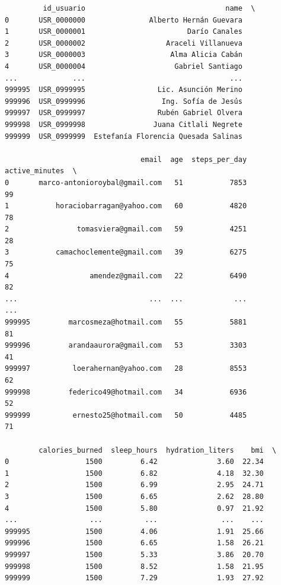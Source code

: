 \begin{lstlisting}
         id_usuario                                 name  \
0       USR_0000000               Alberto Hernán Guevara   
1       USR_0000001                        Darío Canales   
2       USR_0000002                   Araceli Villanueva   
3       USR_0000003                    Alma Alicia Cabán   
4       USR_0000004                     Gabriel Santiago   
...             ...                                  ...   
999995  USR_0999995                 Lic. Asunción Merino   
999996  USR_0999996                  Ing. Sofía de Jesús   
999997  USR_0999997                 Rubén Gabriel Olvera   
999998  USR_0999998                Juana Citlali Negrete   
999999  USR_0999999  Estefanía Florencia Quesada Salinas   

                                email  age  steps_per_day  active_minutes  \
0       marco-antonioroybal@gmail.com   51           7853              99   
1           horaciobarragan@yahoo.com   60           4820              78   
2                tomasviera@gmail.com   59           4251              28   
3           camachoclemente@gmail.com   39           6275              75   
4                   amendez@gmail.com   22           6490              82   
...                               ...  ...            ...             ...   
999995         marcosmeza@hotmail.com   55           5881              81   
999996         arandaaurora@gmail.com   53           3303              41   
999997          loerahernan@yahoo.com   28           8553              62   
999998         federico49@hotmail.com   34           6936              52   
999999          ernesto25@hotmail.com   50           4485              71   

        calories_burned  sleep_hours  hydration_liters    bmi  \
0                  1500         6.42              3.60  22.34   
1                  1500         6.82              4.18  32.30   
2                  1500         6.99              2.95  24.71   
3                  1500         6.65              2.62  28.80   
4                  1500         5.80              0.97  21.92   
...                 ...          ...               ...    ...   
999995             1500         4.06              1.91  25.66   
999996             1500         6.65              1.58  26.21   
999997             1500         5.33              3.86  20.70   
999998             1500         8.52              1.58  21.95   
999999             1500         7.29              1.93  27.92   


\end{lstlisting}
